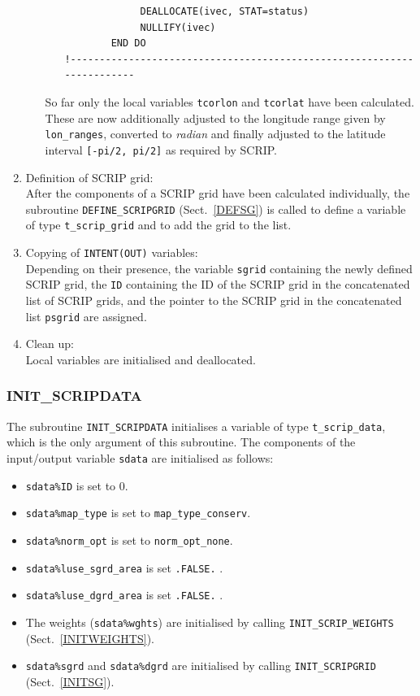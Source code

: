 \documentclass[11pt,twoside]{article}
\begin{document}
\begin{enumerate}
\begin{itemize}
\begin{itemize}
\begin{verbatim}
             DEALLOCATE(ivec, STAT=status)
             NULLIFY(ivec)                 
        END DO
!-----------------------------------------------------------------------
\end{verbatim}

\end{itemize}
So far only the local variables \verb|tcorlon| and \verb|tcorlat| have been
calculated. These are now additionally adjusted to the longitude range given by 
\verb|lon_ranges|, converted to {\it radian} and finally adjusted to
the latitude interval \verb|[-pi/2, pi/2]| as required by SCRIP.
\end{itemize}

\item Definition of SCRIP grid: \\
After the components of a SCRIP grid have been calculated
individually, the subroutine \verb|DEFINE_SCRIPGRID|
(Sect.~\ref{DEFSG}) is called to
define a variable of type \verb|t_scrip_grid| and to add the grid to
the list.
\item Copying of \verb|INTENT(OUT)| variables:\\
Depending on their presence, the variable \verb|sgrid| containing the
newly defined SCRIP grid, the \verb|ID| containing the ID of the SCRIP
grid in the concatenated list of SCRIP grids, and the pointer to the
SCRIP grid in the concatenated list \verb|psgrid| are assigned.

\item Clean up:\\
Local variables are initialised and deallocated.
\end{enumerate}


\subsubsection{INIT\_SCRIPDATA\label{INITSD}}
The subroutine \verb|INIT_SCRIPDATA| initialises a variable of
type \verb|t_scrip_data|, which is the only argument of this
subroutine.
The components of the input/output variable \verb|sdata| are
initialised as follows:
\begin{itemize}
\item \verb|sdata%ID| is set to 0.
\item \verb|sdata%map_type| is set to \verb|map_type_conserv|.
\item \verb|sdata%norm_opt| is set to  \verb|norm_opt_none|.
\item \verb|sdata%luse_sgrd_area| is set \verb|.FALSE.| .
\item \verb|sdata%luse_dgrd_area| is set \verb|.FALSE.| .
\item The weights (\verb|sdata%wghts|) are initialised by
calling \verb|INIT_SCRIP_WEIGHTS| (Sect.~\ref{INITWEIGHTS}).
\item \verb|sdata%sgrd| and \verb|sdata%dgrd| are
 initialised by calling \verb|INIT_SCRIPGRID| (Sect.~\ref{INITSG}).
\end{itemize}
\end{document}
